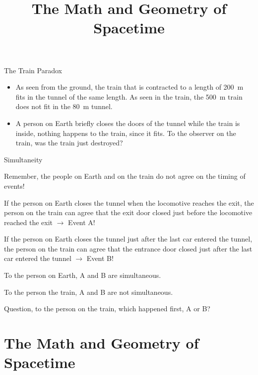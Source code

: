 \documentclass[aspectratio=169,
hyperref={colorlinks,urlcolor=blue}
]{beamer}
\begin{document}
\begin{frame}{The Train Paradox}
\vspace{-1cm}
\begin{itemize}
\item As seen from the ground, the train that is contracted to a length of \SI{200}{m} fits in the tunnel of the same length. As seen in the train, the \SI{500}{m} train does not fit in the \SI{80}{m} tunnel. 
\item A person on Earth briefly closes the doors of the tunnel while the train is inside, nothing happens to the train, since it fits. To the observer on the train, was the train just destroyed?
\end{itemize}
\end{frame}

\begin{bulletframe}{Simultaneity}
\item Remember, the people on Earth and on the train do not agree on the timing of events!
\item If the person on Earth closes the tunnel when the locomotive reaches the exit, the person on the train can agree that the exit door closed just before the locomotive reached the exit $\rightarrow$ Event A!
\item If the person on Earth closes the tunnel just after the last car entered the tunnel, the person on the train can agree that the entrance door closed just after the last car entered the tunnel $\rightarrow$ Event B!
\item To the person on Earth, A and B are simultaneous.
\item To the person the train, A and B are not simultaneous.
\item Question, to the person on the train, which happened first, A or B?
\end{bulletframe}










\section{The Math and Geometry of Spacetime}
\label{sec:themathandgeometryofspacetime}
\title{The Math and Geometry of Spacetime}
\end{document}
